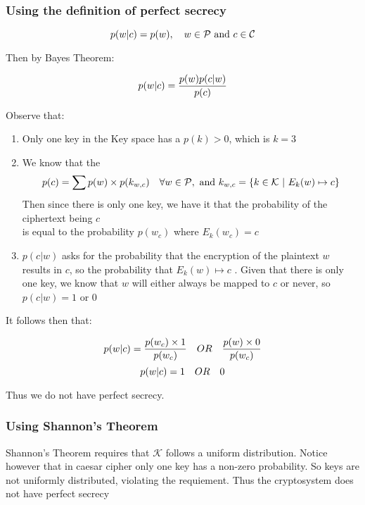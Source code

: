 \documentclass{article}
\numberwithin{equation}{subsection}
\begin{document}
	\vspace{20pt}
	\subsubsection*{Using the definition of perfect secrecy}
	\begin{equation}\notag
		p(w|c) = p(w), \quad w\in \mathcal{P}\ \textrm{and}\  c\in \mathcal{C}
	\end{equation}
	
	Then by Bayes Theorem:

	\begin{equation}\notag
		p(w|c) = \frac{p(w) p(c|w)}{p(c)}
	\end{equation}

	Observe that:
	\begin{enumerate}
		\item Only one key in the Key space has a $p(k)>0$, which is $k=3$
		\vspace{5pt}
		\item We know that the 
			\begin{equation}\notag
				p(c) = \sum p(w)\times p(k_{w,c}) \quad \forall w\in \mathcal{P}, \ \textrm{and}\ k_{w,c} = \{k\in\mathcal{K} \ |\ E_k(w)\mapsto c\}
			\end{equation}
			Then since there is only one key, we have it that the probability of the ciphertext being $c$\\ 
			is equal to the probability $p(w_c)$ where $E_k(w_c) = c$ 
			\vspace{5pt}
	\item $p(c|w)$ asks for the probability that the encryption of the plaintext $w$ results in $c$, so the probability that $E_k(w) \mapsto c$
				. Given that there is only one key, we know that $w$ will either always be mapped to $c$ or never, so $p(c|w) = 1$ or $0$
	\end{enumerate}

	\vspace{10pt}
	It follows then that:
	
	\begin{equation}\notag
		p(w|c) = \frac{p(w_c) \times 1}{p(w_c)} \quad OR \quad \frac{p(w)\times 0}{p(w_c)}
	\end{equation}
		\begin{equation}\notag
			p(w|c) =	1 \quad OR \quad 0
	\end{equation}
	
	Thus we do not have perfect secrecy.

	\vspace{20pt}
	\subsubsection*{Using Shannon's Theorem}
	Shannon's Theorem requires that $\mathcal{K}$ follows a uniform distribution. Notice however that in caesar cipher
	only one key has a non-zero probability. So keys are not uniformly distributed, violating the requiement. Thus
	the cryptosystem does not have perfect secrecy
\end{document}
